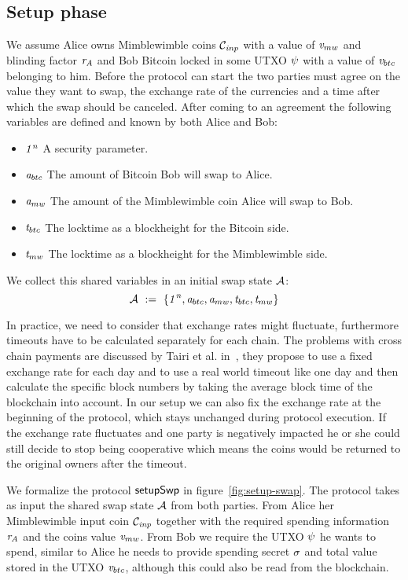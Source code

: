 \subsection{Setup phase}

We assume Alice owns Mimblewimble coins $\mathcal{C}_{\mathit{inp}}$ with a value of $\mathit{v}_{mw}$ and blinding factor $\mathit{r}_{\mathit{A}}$ and Bob
Bitcoin locked in some UTXO $\psi$ with a value of $\mathit{v}_{btc}$ belonging to him.
Before the protocol can start the two parties must agree on the value they want to swap, the exchange rate of the currencies and a time after which the swap should be canceled.
After coming to an agreement the following variables are defined and known by both Alice and Bob:
\begin{itemize}
    \item $\mathit{1^n}$ A security parameter.
    \item $\mathit{a}_{btc}$ The amount of Bitcoin Bob will swap to Alice.
    \item $\mathit{a}_{mw}$ The amount of the Mimblewimble coin Alice will swap to Bob.
    \item $\mathit{t}_{btc}$ The locktime as a blockheight for the Bitcoin side.
    \item $\mathit{t}_{mw}$ The locktime as a blockheight for the Mimblewimble side.
\end{itemize}
We collect this shared variables in an initial swap state $\mathcal{A}$:
\[ \mathcal{A} ~:=~ \{ \mathit{1^n}, \mathit{a}_{btc}, \mathit{a}_{mw}, \mathit{t}_{btc}, \mathit{t}_{mw} \} \]

In practice, we need to consider that exchange rates might fluctuate, furthermore timeouts have to be calculated separately for each chain.
The problems with cross chain payments are discussed by Tairi et al. in~\cite{tairi2019a2l}, they propose to use a fixed exchange rate for each day and to use a real world timeout like one day and then calculate the specific block numbers by taking the average block time of the blockchain into account.
In our setup we can also fix the exchange rate at the beginning of the protocol, which stays unchanged during protocol execution.
If the exchange rate fluctuates and one party is negatively impacted he or she could still decide to stop being cooperative which means the coins would be returned to the original owners after the timeout.

We formalize the protocol $\mathsf{setupSwp}$ in figure~\ref{fig:setup-swap}.
The protocol takes as input the shared swap state $\mathcal{A}$ from both parties.
From Alice her Mimblewimble input coin $\mathcal{C}_{\mathit{inp}}$ together with the required spending information $\mathit{r}_{\mathit{A}}$ and the coins value $\mathit{v}_{mw}$.
From Bob we require the UTXO $\psi$ he wants to spend, similar to Alice he needs to provide spending secret $\mathit{\sigma}$ and total value stored in the UTXO $\mathit{v}_{btc}$, although this could also be read from the blockchain.

